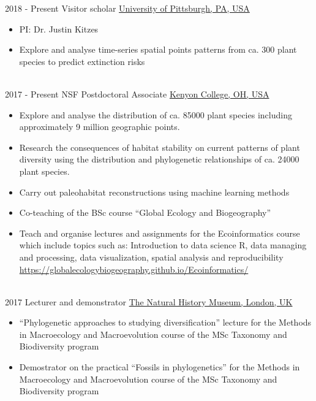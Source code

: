 \documentclass[icon]{twentysecondcv} %
\begin{document}
\begin{twenty}
\twentyitem
    	{2018 -}
		{Present}
        {Visitor scholar}
        {\href{https://www.biology.pitt.edu/}{University of Pittsburgh, PA, USA}}
        {}
        {\begin{itemize}
        \item PI: Dr. Justin Kitzes
        \item Explore and analyse time-series spatial points patterns from ca. 300 plant species to predict extinction risks
        \end{itemize}}
        \\
	\twentyitem
    	{2017 -}
		{Present}
        {NSF Postdoctoral Associate}
        {\href{https://www.kenyon.edu}{Kenyon College, OH, USA}}
        {}
        {
        {\begin{itemize}
        \item Explore and analyse the distribution of ca. 85000 plant species including approximately 9 million geographic points. 
        \item Research the consequences of habitat stability on current patterns of plant diversity using the distribution and phylogenetic relationships of ca. 24000 plant species. 
        \item Carry out paleohabitat reconstructions using machine learning methods
        \item Co-teaching of the BSc course ``Global Ecology and Biogeography'' 
        \item Teach and organise lectures and assignments for the Ecoinformatics course which include topics such as: 
        Introduction to data science R, data managing and processing, data visualization, spatial analysis and reproducibility \url{https://globalecologybiogeography.github.io/Ecoinformatics/}		
    \end{itemize}}
        }
    \\   
     \twentyitem
   		{2017}
		{}
        {Lecturer and demonstrator}
        {\href{http://www.nhm.ac.uk/}{The Natural History Museum, London, UK}}
        {}
        {
        {\begin{itemize}
        \item ``Phylogenetic approaches to studying diversification'' lecture for the Methods in Macroecology and Macroevolution course of the MSc Taxonomy and Biodiversity program
        \item Demostrator on the practical ``Fossils in phylogenetics'' for the Methods in Macroecology and Macroevolution course of the MSc Taxonomy and Biodiversity program
    \end{itemize}}
}
\end{twenty}
\end{document}
